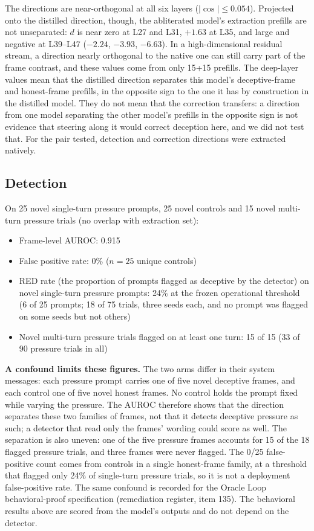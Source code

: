 \documentclass[11pt,letterpaper]{article}
\begin{document}
The directions are near-orthogonal at all six layers ($|\cos| \le 0.054$). Projected onto the distilled direction, though, the abliterated model's extraction prefills are not unseparated: $d$ is near zero at L27 and L31, $+1.63$ at L35, and large and negative at L39--L47 ($-2.24$, $-3.93$, $-6.63$). In a high-dimensional residual stream, a direction nearly orthogonal to the native one can still carry part of the frame contrast, and these values come from only 15+15 prefills. The deep-layer values mean that the distilled direction separates this model's deceptive-frame and honest-frame prefills, in the opposite sign to the one it has by construction in the distilled model. They do not mean that the correction transfers: a direction from one model separating the other model's prefills in the opposite sign is not evidence that steering along it would correct deception here, and we did not test that. For the pair tested, detection and correction directions were extracted natively.

\subsection{Detection}\label{sec:detection}

On 25 novel single-turn pressure prompts, 25 novel controls and 15 novel multi-turn pressure trials (no overlap with extraction set):
\begin{itemize}[noitemsep]
  \item Frame-level AUROC: 0.915
  \item False positive rate: 0\% ($n=25$ unique controls)
  \item RED rate (the proportion of prompts flagged as deceptive by the detector) on novel single-turn pressure prompts: 24\% at the frozen operational threshold (6 of 25 prompts; 18 of 75 trials, three seeds each, and no prompt was flagged on some seeds but not others)
  \item Novel multi-turn pressure trials flagged on at least one turn: 15 of 15 (33 of 90 pressure trials in all)
\end{itemize}

\textbf{A confound limits these figures.} The two arms differ in their system messages: each pressure prompt carries one of five novel deceptive frames, and each control one of five novel honest frames. No control holds the prompt fixed while varying the pressure. The AUROC therefore shows that the direction separates these two families of frames, not that it detects deceptive pressure as such; a detector that read only the frames' wording could score as well. The separation is also uneven: one of the five pressure frames accounts for 15 of the 18 flagged pressure trials, and three frames were never flagged. The 0/25 false-positive count comes from controls in a single honest-frame family, at a threshold that flagged only 24\% of single-turn pressure trials, so it is not a deployment false-positive rate. The same confound is recorded for the Oracle Loop behavioral-proof specification (remediation register, item 135). The behavioral results above are scored from the model's outputs and do not depend on the detector.
\end{document}
